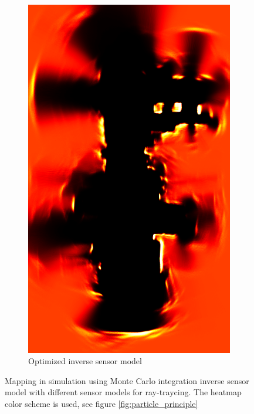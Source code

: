 \begin{figure}[htbp]
\begin{subfigure}[t]{0.45\textwidth}
		\includegraphics[width=\textwidth]{figures/static_mapping/monte_carlo_map_optimized}		
		\caption{Optimized inverse sensor model}
        \label{fig:particle_shot-croped}
	\end{subfigure}
	\caption{Mapping in simulation using Monte Carlo integration inverse sensor model with different sensor models for ray-traycing. The heatmap color scheme is used, see figure \vref{fig:particle_principle}}
\end{figure}

